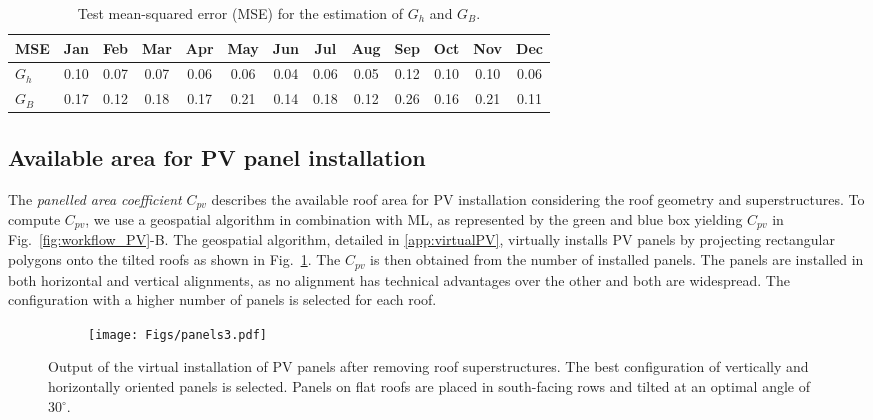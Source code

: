 \begin{table}[tb]
\centering
\footnotesize
\caption{Test mean-squared error (MSE) for the estimation of $G_h$ and $G_B$.}
\label{tab:G_train}
\begin{tabular}{lcccccccccccc}
\hline 
 \textbf{MSE}   & Jan  & Feb  & Mar   & Apr   & May   & Jun   & Jul   & Aug   & Sep   & Oct  & Nov  & Dec  \\
\hline 
$G_h$  & 0.10 & 0.07 & 0.07  & 0.06  & 0.06  & 0.04  & 0.06  & 0.05  & 0.12  & 0.10 & 0.10 & 0.06 \\
$G_B$  & 0.17 & 0.12 & 0.18 & 0.17 & 0.21 & 0.14  & 0.18  & 0.12 & 0.26 & 0.16 & 0.21 & 0.11 \\
\hline 
\end{tabular}
\end{table}


\subsection{Available area for PV panel installation}
\label{panels}

The \textit{panelled area coefficient} $C_{\mathit{pv}}$ describes the available roof area for PV installation considering the roof geometry and superstructures. To compute $C_{\mathit{pv}}$, we use a geospatial algorithm in combination with ML, as represented by the green and blue box yielding $C_{\mathit{pv}}$ in Fig.~\ref{fig:workflow_PV}-B.
%
The geospatial algorithm, detailed in \ref{app:virtualPV}, virtually installs PV panels by projecting rectangular polygons onto the tilted roofs as shown in Fig.~\ref{fig:panels}. The $C_{\mathit{pv}}$ is then obtained from the number of installed panels.
The panels are installed in both horizontal and vertical alignments, as no alignment has technical advantages over the other and both are widespread. The configuration with a higher number of panels is selected for each roof.

\begin{figure}[tb]
\centering
\begin{subfigure}{.5\textwidth}
  \centering
  \texttt{[image: Figs/panels3.pdf]}  
\end{subfigure}
\caption{Output of the virtual installation of PV panels after removing roof superstructures. The best configuration of vertically and horizontally oriented panels is selected. Panels on flat roofs are placed in south-facing rows and tilted at an optimal angle of 30$^\circ$.}
\label{fig:panels}
\end{figure}

